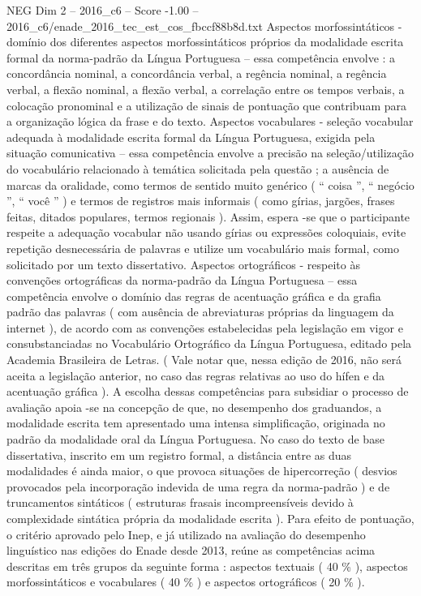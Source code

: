 \begin{textsample}{NEG Dim 2 – 2016\_c6 – Score -1.00 – 2016\_c6/enade\_2016\_tec\_est\_cos\_fbccf88b8d.txt}
Aspectos morfossintáticos - domínio dos diferentes aspectos morfossintáticos próprios da modalidade escrita formal da norma-padrão da Língua Portuguesa – essa competência envolve : a concordância nominal, a concordância verbal, a regência nominal, a regência verbal, a flexão nominal, a flexão verbal, a correlação entre os tempos verbais, a colocação pronominal e a utilização de sinais de pontuação que contribuam para a organização lógica da frase e do texto.
Aspectos vocabulares - seleção vocabular adequada à modalidade escrita formal da Língua Portuguesa, exigida pela situação comunicativa – essa competência envolve a precisão na seleção/utilização do vocabulário relacionado à temática solicitada pela questão ; a ausência de marcas da oralidade, como termos de sentido muito genérico ( “ coisa ”, “ negócio ”, “ você ” ) e termos de registros mais informais ( como gírias, jargões, frases feitas, ditados populares, termos regionais ).
Assim, espera -se que o participante respeite a adequação vocabular não usando gírias ou expressões coloquiais, evite repetição desnecessária de palavras e utilize um vocabulário mais formal, como solicitado por um texto dissertativo.
Aspectos ortográficos - respeito às convenções ortográficas da norma-padrão da Língua Portuguesa – essa competência envolve o domínio das regras de acentuação gráfica e da grafia padrão das palavras ( com ausência de abreviaturas próprias da linguagem da internet ), de acordo com as convenções estabelecidas pela legislação em vigor e consubstanciadas no Vocabulário Ortográfico da Língua Portuguesa, editado pela Academia Brasileira de Letras. ( Vale notar que, nessa edição de 2016, não será aceita a legislação anterior, no caso das regras relativas ao uso do hífen e da acentuação gráfica ).
A escolha dessas competências para subsidiar o processo de avaliação apoia -se na concepção de que, no desempenho dos graduandos, a modalidade escrita tem apresentado uma intensa simplificação, originada no padrão da modalidade oral da Língua Portuguesa.
No caso do texto de base dissertativa, inscrito em um registro formal, a distância entre as duas modalidades é ainda maior, o que provoca situações de hipercorreção ( desvios provocados pela incorporação indevida de uma regra da norma-padrão ) e de truncamentos sintáticos ( estruturas frasais incompreensíveis devido à complexidade sintática própria da modalidade escrita ).
Para efeito de pontuação, o critério aprovado pelo Inep, e já utilizado na avaliação do desempenho linguístico nas edições do Enade desde 2013, reúne as competências acima descritas em três grupos da seguinte forma : aspectos textuais ( 40 \% ), aspectos morfossintáticos e vocabulares ( 40 \% ) e aspectos ortográficos ( 20 \% ).

\end{textsample}
